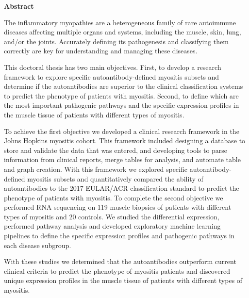 \cleardoublepage
\thispagestyle{empty}

\begin{center}
    \Large
    \textbf{\thetitle}
    
    \vspace{0.2cm}
    \large
    \textbf{\theauthor}
    
    \vspace{0.2cm}
    \textbf{Abstract}
\end{center}

The inflammatory myopathies are a heterogeneous family of rare autoimmune diseases affecting multiple organs and systems, including the muscle, skin, lung, and/or the joints.  Accurately defining its pathogenesis and classifying them correctly are key for understanding and managing these diseases.

This doctoral thesis has two main objectives. First, to develop a research framework to explore specific autoantibody-defined myositis subsets and determine if the autoantibodies are superior to the clinical classification systems to predict the phenotype of patients with myositis. Second, to define which are the most important pathogenic pathways and the specific expression profiles in the muscle tissue of patients with different types of myositis.

To achieve the first objective we developed a clinical research framework in the Johns Hopkins myositis cohort. This framework included designing a database to store and validate the data that was entered, and developing tools to parse information from clinical reports, merge tables for analysis, and automate table and graph creation. With this framework we explored specific autoantibody-defined myositis subsets and quantitatively compared the ability of autoantibodies to the 2017 EULAR/ACR classification standard to predict the phenotype of patients with myositis. To complete the second objective we performed RNA sequencing on 119 muscle biopsies of patients with different types of myositis and 20 controls. We studied the differential expression, performed pathway analysis and developed exploratory machine learning pipelines to define the specific expression profiles and pathogenic pathways in each disease subgroup. 

With these studies we determined that the autoantibodies outperform current clinical criteria to predict the phenotype of myositis patients and discovered unique expression profiles in the muscle tissue of patients with different types of myositis.
